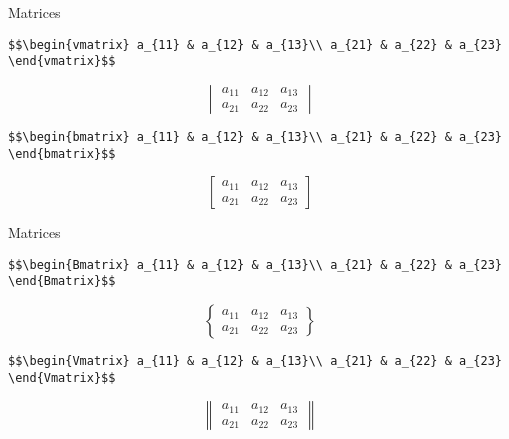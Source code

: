 \documentclass[ignorenonframetext,]{beamer}
\begin{document}
\begin{frame}[fragile]{Matrices}
\protect\hypertarget{matrices-1}{}

\texttt{\$\$\textbackslash{}begin\{vmatrix\}\ a\_\{11\}\ \&\ a\_\{12\}\ \&\ a\_\{13\}\textbackslash{}\textbackslash{}\ a\_\{21\}\ \&\ a\_\{22\}\ \&\ a\_\{23\}\ \textbackslash{}end\{vmatrix\}\$\$}

\[\begin{vmatrix}
a_{11} & a_{12} & a_{13}\\
a_{21} & a_{22} & a_{23}
\end{vmatrix}\]

\texttt{\$\$\textbackslash{}begin\{bmatrix\}\ a\_\{11\}\ \&\ a\_\{12\}\ \&\ a\_\{13\}\textbackslash{}\textbackslash{}\ a\_\{21\}\ \&\ a\_\{22\}\ \&\ a\_\{23\}\ \textbackslash{}end\{bmatrix\}\$\$}

\[\begin{bmatrix}
a_{11} & a_{12} & a_{13}\\
a_{21} & a_{22} & a_{23}
\end{bmatrix}\]

\end{frame}

\begin{frame}[fragile]{Matrices}
\protect\hypertarget{matrices-2}{}

\texttt{\$\$\textbackslash{}begin\{Bmatrix\}\ a\_\{11\}\ \&\ a\_\{12\}\ \&\ a\_\{13\}\textbackslash{}\textbackslash{}\ a\_\{21\}\ \&\ a\_\{22\}\ \&\ a\_\{23\}\ \textbackslash{}end\{Bmatrix\}\$\$}

\[\begin{Bmatrix}
a_{11} & a_{12} & a_{13}\\
a_{21} & a_{22} & a_{23}
\end{Bmatrix}\]

\texttt{\$\$\textbackslash{}begin\{Vmatrix\}\ a\_\{11\}\ \&\ a\_\{12\}\ \&\ a\_\{13\}\textbackslash{}\textbackslash{}\ a\_\{21\}\ \&\ a\_\{22\}\ \&\ a\_\{23\}\ \textbackslash{}end\{Vmatrix\}\$\$}

\[\begin{Vmatrix}
a_{11} & a_{12} & a_{13}\\
a_{21} & a_{22} & a_{23}
\end{Vmatrix}\]

\end{frame}
\end{document}

